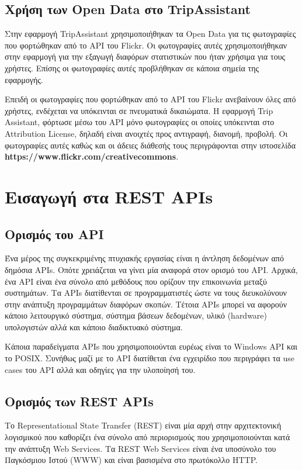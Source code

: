 \documentclass[oneside, 12pt]{book}
\begin{document}
\section{Χρήση των Open Data στο TripAssistant}
Στην εφαρμογή TripAssistant χρησιμοποιήθηκαν τα Open Data για τις 
φωτογραφίες που φορτώθηκαν από το API του Flickr. Οι φωτογραφίες 
αυτές χρησιμοποιήθηκαν στην εφαρμογή για την εξαγωγή διαφόρων 
στατιστικών που ήταν χρήσιμα για τους χρήστες. Επίσης οι 
φωτογραφίες αυτές προβλήθηκαν σε κάποια σημεία της εφαρμογής.

Επειδή οι φωτογραφίες που φορτώθηκαν από το API του Flickr 
ανεβαίνουν όλες από χρήστες, ενδέχεται να υπόκεινται σε 
πνευματικά δικαιώματα. Η εφαρμογή Trip Assistant, φόρτωσε μέσω του 
API μόνο φωτογραφίες οι οποίες υπόκεινται στο Attri\-bution License, 
δηλαδή είναι ανοιχτές προς αντιγραφή, διανομή, προβολή. Οι φωτογραφίες αυτές καθώς και οι άδειες διάθεσής τους περιγράφονται 
στην ιστοσελίδα \textbf{https://www.flickr.com/creativecommons}.

\chapter{Εισαγωγή στα REST APIs}
\section{Ορισμός του API}
Ένα μέρος της συγκεκριμένης πτυχιακής εργασίας είναι η άντληση δεδομένων από δημόσια APIs.
Οπότε χρειάζεται να γίνει μία αναφορά στον ορισμό του API.
Αρχικά, ένα API είναι ένα σύνολο από μεθόδους που ορίζουν την επικοινωνία μεταξύ συστημάτων. Τα APIs διατίθενται σε προγραμματιστές ώστε να τους διευκολύνουν στην ανάπτυξη προγραμμάτων διαφόρων σκοπών.
Τέτοια APIs μπορεί να αφορούν κάποιο λειτουργικό σύστημα, σύστημα βάσεων δεδομένων, υλικό (hardware) υπολογιστών αλλά και κάποιο διαδικτυακό σύστημα.

Κάποια παραδείγματα APIs που χρησιμοποιούνται ευρέως είναι το Windows API και το POSIX.
Συνήθως μαζί με το API διατίθεται ένα εγχειρίδιο που περιγράφει τα use cases του API αλλά και οδηγίες για την υλοποίησή του.

\section{Ορισμός των REST APIs}
Το Representational State Transfer (REST) είναι μία αρχή στην αρχιτεκτονική λογισμικού που καθορίζει ένα σύνολο από περιορισμούς που χρησιμοποιούνται κατά την ανάπτυξη Web Services. Τα REST Web Services είναι ένα υποσύνολο του Παγκόσμιου Ιστού (WWW) και είναι βασισμένα στο πρωτόκολλο HTTP.  
\end{document}
